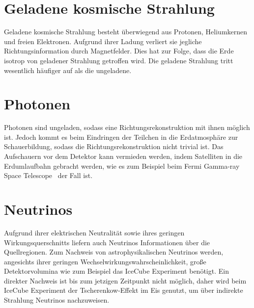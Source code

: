 \section*{Geladene kosmische Strahlung}
Geladene kosmische Strahlung besteht überwiegend aus Protonen, Heliumkernen und freien Elektronen. 
Aufgrund ihrer Ladung verliert sie jegliche Richtungsinformation durch Magnetfelder. 
Dies hat zur Folge, dass die Erde isotrop von geladener Strahlung getroffen wird.
Die geladene Strahlung tritt wesentlich häufiger auf als die ungeladene. 

\section*{Photonen}
Photonen sind ungeladen, sodass eine Richtungsrekonstruktion mit ihnen möglich ist. 
Jedoch kommt es beim Eindringen der Teilchen in die Erdatmosphäre zur Schauerbildung, sodass die Richtungsrekonstruktion nicht trivial ist. 
Das Aufschauern vor dem Detektor kann vermieden werden, indem Satelliten in die Erdumlaufbahn gebracht werden, wie es zum Beispiel beim Fermi Gamma-ray Space Telescope~\cite{fermi} der Fall ist.

\section*{Neutrinos}
Aufgrund ihrer elektrischen Neutralität sowie ihres geringen Wirkungsquerschnitts liefern auch Neutrinos Informationen über die Quellregionen. 
Zum Nachweis von astrophysikalischen Neutrinos werden, angesichts ihrer geringen Wechselwirkungswahrscheinlichkeit, große Detektorvolumina wie zum Beispiel das IceCube Experiment benötigt.
Ein direkter Nachweis ist bis zum jetzigen Zeitpunkt nicht möglich, daher wird beim IceCube Experiment \cite{icecube} der Tscherenkow-Effekt im Eis genutzt, um über indirekte Strahlung Neutrinos nachzuweisen.
